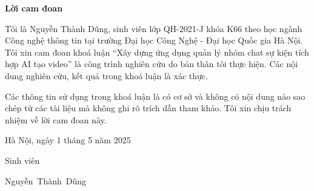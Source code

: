 \setcounter{page}{1}
\begin{center}
	\textbf{\large{Lời cam đoan}	}
\end{center}
Tôi là Nguyễn Thành Dũng, sinh viên lớp QH-2021-J khóa K66 theo học ngành Công nghệ thông tin tại trường Đại học Công Nghệ - Đại học Quốc gia Hà Nội. Tôi xin cam đoan khoá luận ``Xây dựng ứng dụng quản lý nhóm chat sự kiện tích hợp AI tạo video'' là công trình nghiên cứu do bản thân tôi thực hiện. Các nội dung nghiên cứu, kết quả trong khoá luận là xác thực.

Các thông tin sử dụng trong khoá luận là có cơ sở và không có nội dung nào sao chép từ các tài liệu mà không ghi rõ trích dẫn tham khảo. Tôi xin chịu trách nhiệm về lời cam đoan này.

\begin{flushright}
	Hà Nội, ngày 1 tháng 5 năm 2025
\end{flushright}

\begin{changemargin}{12cm}{2cm}
	Sinh viên
	\\[2cm]
\end{changemargin}

\begin{changemargin}{11cm}{2cm}
	\begin{center}
		Nguyễn~Thành~Dũng
	\end{center}
\end{changemargin}